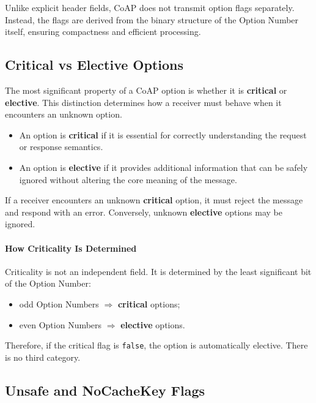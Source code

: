 \documentclass{scrbook}
\begin{document}
Unlike explicit header fields, CoAP does not transmit option flags separately. Instead, the flags are derived from the binary structure of the Option Number itself, ensuring compactness and efficient processing.

\subsection{Critical vs Elective Options}

The most significant property of a CoAP option is whether it is \textbf{critical} or \textbf{elective}. This distinction determines how a receiver must behave when it encounters an unknown option.

\begin{itemize}
    \item An option is \textbf{critical} if it is essential for correctly understanding the request or response semantics.
    \item An option is \textbf{elective} if it provides additional information that can be safely ignored without altering the core meaning of the message.
\end{itemize}

If a receiver encounters an unknown \textbf{critical} option, it must reject the message and respond with an error. Conversely, unknown \textbf{elective} options may be ignored.

\paragraph{How Criticality Is Determined}

Criticality is not an independent field. It is determined by the least significant bit of the Option Number:

\begin{itemize}
    \item odd Option Numbers $\Rightarrow$ \textbf{critical} options;
    \item even Option Numbers $\Rightarrow$ \textbf{elective} options.
\end{itemize}

Therefore, if the critical flag is \texttt{false}, the option is automatically elective. There is no third category.

\subsection{Unsafe and NoCacheKey Flags}
\end{document}
